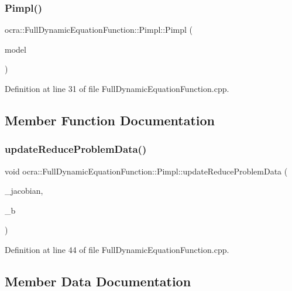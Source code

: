 \subsubsection{\texorpdfstring{Pimpl()}{Pimpl()}}
{\footnotesize\ttfamily ocra\+::\+Full\+Dynamic\+Equation\+Function\+::\+Pimpl\+::\+Pimpl (\begin{DoxyParamCaption}\item[{const Model \&}]{model }\end{DoxyParamCaption})\hspace{0.3cm}{\ttfamily [inline]}}



Definition at line 31 of file Full\+Dynamic\+Equation\+Function.\+cpp.



\subsection{Member Function Documentation}
\hypertarget{structFullDynamicEquationFunction_1_1Pimpl_a4d1df4cadec603942aeb750212a2d258}{}\label{structFullDynamicEquationFunction_1_1Pimpl_a4d1df4cadec603942aeb750212a2d258} 
\subsubsection{\texorpdfstring{update\+Reduce\+Problem\+Data()}{updateReduceProblemData()}}
{\footnotesize\ttfamily void ocra\+::\+Full\+Dynamic\+Equation\+Function\+::\+Pimpl\+::update\+Reduce\+Problem\+Data (\begin{DoxyParamCaption}\item[{const Eigen\+::\+Matrix\+Xd \&}]{\+\_\+jacobian,  }\item[{const Eigen\+::\+Vector\+Xd \&}]{\+\_\+b }\end{DoxyParamCaption})\hspace{0.3cm}{\ttfamily [inline]}}



Definition at line 44 of file Full\+Dynamic\+Equation\+Function.\+cpp.



\subsection{Member Data Documentation}
\hypertarget{structFullDynamicEquationFunction_1_1Pimpl_a795bb07591fdf52c4b60cccfb6b3e811}{}\label{structFullDynamicEquationFunction_1_1Pimpl_a795bb07591fdf52c4b60cccfb6b3e811} 
